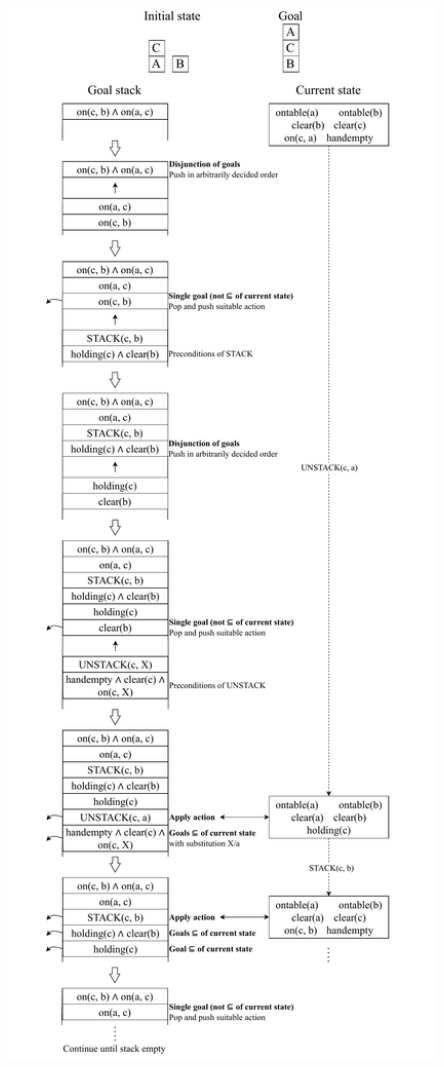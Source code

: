 \begin{example} 
    \begin{center}
        \includegraphics[trim={0 32.2cm 0 0}, clip, width=0.85\textwidth]{img/_strips_example.pdf}

\end{center}
\end{example}
